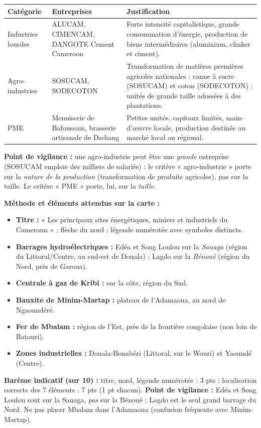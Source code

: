 \documentclass[11pt]{article}
\begin{document}
\begin{corrige}
\begin{center}
\begin{tabularx}{\linewidth}{|l|X|X|}
\hline
\rowcolor{popblueL} \textbf{Catégorie} & \textbf{Entreprises} & \textbf{Justification} \\
\hline
Industries lourdes & ALUCAM, CIMENCAM, DANGOTE Cement Cameroon & Forte intensité capitalistique, grande consommation d'énergie, production de biens intermédiaires (aluminium, clinker et ciment). \\
\hline
Agro-industries & SOSUCAM, SODECOTON & Transformation de matières premières agricoles nationales : canne à sucre (SOSUCAM) et coton (SODECOTON) ; unités de grande taille adossées à des plantations. \\
\hline
PME & Menuiserie de Bafoussam, brasserie artisanale de Dschang & Petites unités, capitaux limités, main-d'œuvre locale, production destinée au marché local ou régional. \\
\hline
\end{tabularx}
\end{center}
\textbf{Point de vigilance :} une agro-industrie peut être une \emph{grande} entreprise (SOSUCAM emploie des milliers de salariés) : le critère « agro-industrie » porte sur la \emph{nature de la production} (transformation de produits agricoles), pas sur la taille. Le critère « PME » porte, lui, sur la \emph{taille}.
\end{corrige}

\begin{corrige}
\textbf{Méthode et éléments attendus sur la carte :}
\begin{itemize}
\item \textbf{Titre :} « Les principaux sites énergétiques, miniers et industriels du Cameroun » ; flèche du nord ; légende numérotée avec symboles distincts.
\item \textbf{Barrages hydroélectriques :} Edéa et Song Loulou sur la \emph{Sanaga} (région du Littoral/Centre, au sud-est de Douala) ; Lagdo sur la \emph{Bénoué} (région du Nord, près de Garoua).
\item \textbf{Centrale à gaz de Kribi :} sur la côte, région du Sud.
\item \textbf{Bauxite de Minim-Martap :} plateau de l'Adamaoua, au nord de Ngaoundéré.
\item \textbf{Fer de Mbalam :} région de l'Est, près de la frontière congolaise (non loin de Batouri).
\item \textbf{Zones industrielles :} Douala-Bonabéri (Littoral, sur le Wouri) et Yaoundé (Centre).
\end{itemize}
\textbf{Barème indicatif (sur 10) :} titre, nord, légende numérotée : 3 pts ; localisation correcte des 7 éléments : 7 pts (1 pt chacun).
\textbf{Point de vigilance :} Edéa et Song Loulou sont sur la Sanaga, \emph{pas} sur la Bénoué ; Lagdo est le seul grand barrage du Nord. Ne pas placer Mbalam dans l'Adamaoua (confusion fréquente avec Minim-Martap).
\end{corrige}
\end{document}

